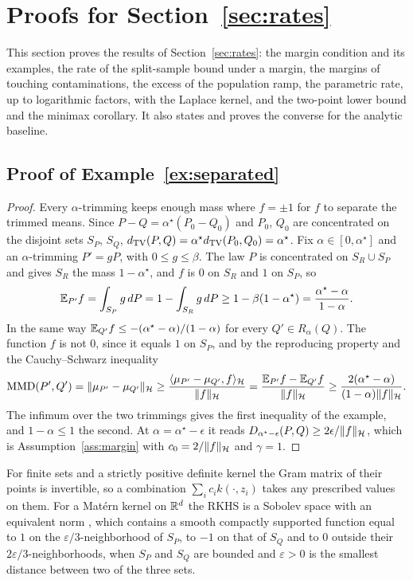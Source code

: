 \section{Proofs for Section~\ref{sec:rates}}
\label{app:rates}

This section proves the results of Section~\ref{sec:rates}: the margin condition and its examples, the rate of the
split-sample bound under a margin, the margins of touching contaminations, the excess of the population ramp, the
parametric rate, up to logarithmic factors, with the Laplace kernel, and the two-point lower bound and the minimax
corollary. It also states and proves the converse for the analytic baseline.

\subsection{Proof of Example~\ref{ex:separated}}
\label{sec:exproof}

\begin{proof}
Every $\alpha$-trimming keeps enough mass where $f=\pm1$ for $f$ to separate the trimmed means. Since
$P-Q=\alpha^\star(P_0-Q_0)$ and $P_0$, $Q_0$ are concentrated on the disjoint sets $S_P$, $S_Q$,
$d_{\mathrm{TV}}(P,Q)=\alpha^\star d_{\mathrm{TV}}(P_0,Q_0)=\alpha^\star$. Fix $\alpha\in[0,\alpha^\star]$ and an $\alpha$-trimming $P'=gP$, with
$0\le g\le\beta$. The law $P$ is concentrated on $S_R\cup S_P$ and gives $S_R$ the mass $1-\alpha^\star$, and $f$ is $0$
on $S_R$ and $1$ on $S_P$, so
\[
\mathbb{E}_{P'}f=\int_{S_P}g\,dP=1-\int_{S_R}g\,dP\ge1-\beta(1-\alpha^\star)=\frac{\alpha^\star-\alpha}{1-\alpha}.
\]
In the same way $\mathbb{E}_{Q'}f\le-(\alpha^\star-\alpha)/(1-\alpha)$ for every $Q'\in R_\alpha(Q)$. The function $f$ is not $0$,
since it equals $1$ on $S_P$, and by the reproducing property and the Cauchy--Schwarz inequality
\[
\operatorname{MMD}(P',Q')=\|\mu_{P'}-\mu_{Q'}\|_{\mathcal{H}}\ge\frac{\langle\mu_{P'}-\mu_{Q'},f\rangle_{\mathcal{H}}}{\|f\|_{\mathcal{H}}}
=\frac{\mathbb{E}_{P'}f-\mathbb{E}_{Q'}f}{\|f\|_{\mathcal{H}}}\ge\frac{2(\alpha^\star-\alpha)}{(1-\alpha)\|f\|_{\mathcal{H}}}.
\]
The infimum over the two trimmings gives the first inequality of the example, and $1-\alpha\le1$ the second. At
$\alpha=\alpha^\star-\epsilon$ it reads $D_{\alpha^\star-\epsilon}(P,Q)\ge2\epsilon/\|f\|_{\mathcal{H}}$, which is
Assumption~\ref{ass:margin} with $c_0=2/\|f\|_{\mathcal{H}}$ and $\gamma=1$.
\end{proof}

For finite sets and a strictly positive definite kernel the Gram matrix of their points is invertible, so a combination
$\sum_ic_ik(\cdot,z_i)$ takes any prescribed values on them. For a Mat\'ern kernel on $\mathbb{R}^d$ the RKHS is a Sobolev space
with an equivalent norm \citep[Chapter~10]{wendland2005scattered}, which contains a smooth compactly supported function equal to
$1$ on the $\varepsilon/3$-neighborhood of $S_P$, to $-1$ on that of $S_Q$ and to $0$ outside their
$2\varepsilon/3$-neighborhoods, when $S_P$ and $S_Q$ are bounded and $\varepsilon>0$ is the smallest distance between
two of the three sets.

